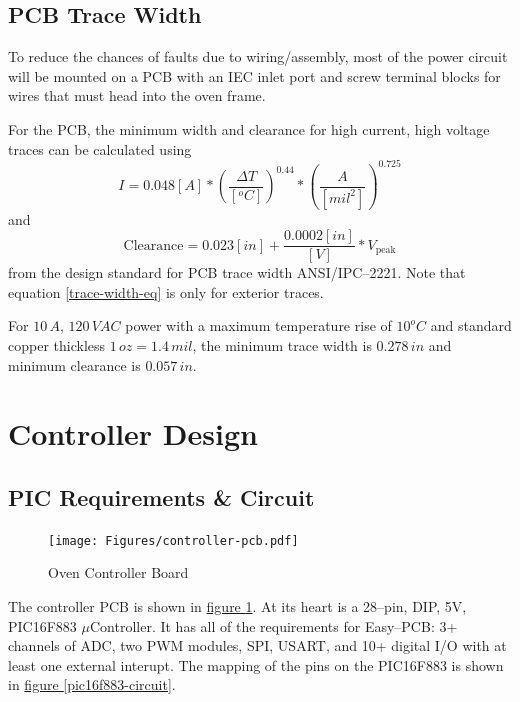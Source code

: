 \documentclass[10pt, twocolumn]{article}
\begin{document}
\subsection{PCB Trace Width}

To reduce the chances of faults due to wiring/assembly, most of the power
circuit will be mounted on a PCB with an IEC inlet port and screw terminal
blocks for wires that must head into the oven frame.

For the PCB, the minimum width and clearance for high current,
high voltage traces can be calculated using
\begin{equation}
I=0.048[A]*\left(\frac{\Delta T}{[^{o}C]}\right)^{0.44}*\left(\frac{A}{[mil^{2}]}\right)^{0.725}
\label{trace-width-eq}
\end{equation}
and
\begin{equation}
\textrm{Clearance}=0.023[in]+\frac{0.0002[in]}{[V]}*V_{\textrm{peak}}
\end{equation}
from the design standard for PCB trace width ANSI/IPC--2221. Note that
equation \ref{trace-width-eq} is only for exterior traces.

For $10\,A$, $120\,VAC$ power with a maximum temperature rise of $10^{o}C$
and standard copper thickless $1\,oz=1.4\,mil$, the minimum trace width
is $0.278\,in$ and minimum clearance is $0.057\,in$.

\section{Controller Design}
\label{controller-section}

\subsection{PIC Requirements \& Circuit}

\begin{figure}
	\centering
	\texttt{[image: Figures/controller-pcb.pdf]}
	\caption{Oven Controller Board}
	\label{controller-pcb}
\end{figure}

The controller PCB is shown in
\hyperref[controller-pcb]{figure \ref{controller-pcb}}.
At its heart is a 28--pin, DIP, 5V, \textrm{PIC16F883} $\mu$Controller.
It has all of the requirements for  \textrm{Easy--PCB}:
3+ channels of ADC, two PWM modules, SPI, USART, and 10+
digital I/O with at least one external interupt.
The mapping of the pins on the \textrm{PIC16F883} is shown in
\hyperref[pic16f883-circuit]{figure \ref{pic16f883-circuit}}.
\end{document}
